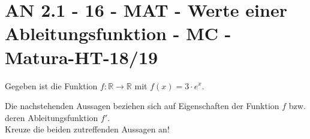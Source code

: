 \section{AN 2.1 - 16 - MAT - Werte einer Ableitungsfunktion - MC - Matura-HT-18/19}

\begin{beispiel}[AN 2.1]{1}
Gegeben ist die Funktion $f\!:\mathbb{R}\rightarrow\mathbb{R}$ mit $f(x)=3\cdot e^x$.

Die nachstehenden Aussagen beziehen sich auf Eigenschaften der Funktion $f$ bzw. deren Ableitungsfunktion $f'$.\\
Kreuze die beiden zutreffenden Aussagen an!

\end{beispiel}